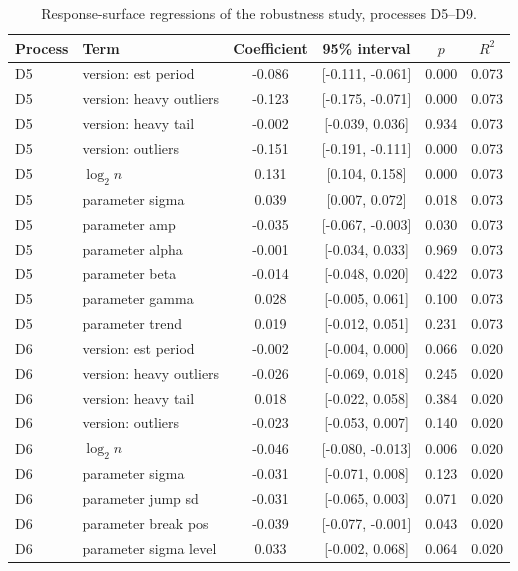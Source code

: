\begin{table}[!htbp]
\centering
\begin{threeparttable}
\caption{Response-surface regressions of the robustness study, processes D5--D9.}
\label{tab:si-response2}
\scriptsize
\begin{tabular}{llcccc}
\toprule
Process & Term & Coefficient & 95\% interval & $p$ & $R^2$ \\
\midrule
D5 & version: est period & -0.086 & [-0.111, -0.061] & 0.000 & 0.073 \\
D5 & version: heavy outliers & -0.123 & [-0.175, -0.071] & 0.000 & 0.073 \\
D5 & version: heavy tail & -0.002 & [-0.039, 0.036] & 0.934 & 0.073 \\
D5 & version: outliers & -0.151 & [-0.191, -0.111] & 0.000 & 0.073 \\
D5 & $\log_2 n$ & 0.131 & [0.104, 0.158] & 0.000 & 0.073 \\
D5 & parameter sigma & 0.039 & [0.007, 0.072] & 0.018 & 0.073 \\
D5 & parameter amp & -0.035 & [-0.067, -0.003] & 0.030 & 0.073 \\
D5 & parameter alpha & -0.001 & [-0.034, 0.033] & 0.969 & 0.073 \\
D5 & parameter beta & -0.014 & [-0.048, 0.020] & 0.422 & 0.073 \\
D5 & parameter gamma & 0.028 & [-0.005, 0.061] & 0.100 & 0.073 \\
D5 & parameter trend & 0.019 & [-0.012, 0.051] & 0.231 & 0.073 \\
D6 & version: est period & -0.002 & [-0.004, 0.000] & 0.066 & 0.020 \\
D6 & version: heavy outliers & -0.026 & [-0.069, 0.018] & 0.245 & 0.020 \\
D6 & version: heavy tail & 0.018 & [-0.022, 0.058] & 0.384 & 0.020 \\
D6 & version: outliers & -0.023 & [-0.053, 0.007] & 0.140 & 0.020 \\
D6 & $\log_2 n$ & -0.046 & [-0.080, -0.013] & 0.006 & 0.020 \\
D6 & parameter sigma & -0.031 & [-0.071, 0.008] & 0.123 & 0.020 \\
D6 & parameter jump sd & -0.031 & [-0.065, 0.003] & 0.071 & 0.020 \\
D6 & parameter break pos & -0.039 & [-0.077, -0.001] & 0.043 & 0.020 \\
D6 & parameter sigma level & 0.033 & [-0.002, 0.068] & 0.064 & 0.020 \\

\end{tabular}
\end{threeparttable}
\end{table}
